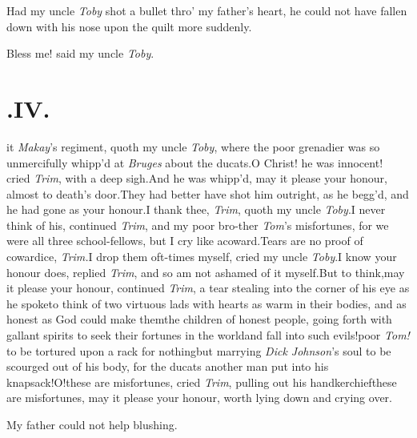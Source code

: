 \documentclass{article}
\begin{document}
\tsh Had my uncle \textit{Toby} shot a bullet thro’ my
father’s heart, he could not have fallen down with his nose
upon the quilt more suddenly.

Bless me! said my uncle \textit{Toby}.

\bigskip
\section{.\enspace IV.}

 it \textit{Makay}’s regiment, quoth\break
my uncle \textit{Toby}, where the poor\break
grenadier was so unmercifully whipp’d at \textit{Bruges}
about the ducats.\tsk O Christ! he was innocent! cried
\textit{Trim}, with a deep sigh.\tsk And he was whipp’d, may
it please your honour, almost to death’s door.\tsk They had
better have shot him outright, as he begg’d, and he had gone
as your honour.\tsh I thank thee, \textit{Trim}, quoth my uncle
\textit{Toby}.\tsh I never think of his, continued
\textit{Trim}, and my poor bro-\break ther \textit{Tom}’s
misfortunes, for we were all three school-fellows, but I cry
like a\break coward.\tsh Tears are no proof of cowardice,
\textit{Trim.}\tsk I drop them oft-times myself, cried my
uncle \textit{Toby}.\tsh I know your honour does, replied
\textit{Trim}, and so am not ashamed of it myself.\tsk But
to think,\break may it please your honour, continued
\textit{Trim}, a tear stealing into the corner of his eye as
he spoke\tsk to think of two virtuous lads with hearts as
warm in their bodies, and as honest as God could make
them\tsk the children of honest people, going forth with
gallant spirits to seek their fortunes in the world\tsk and
fall into such evils!\tsk poor \textit{Tom!} to be tortured
upon a rack for nothing\tsk but marrying\break
{}
\textit{Dick Johnson}’s soul to be scourged out of his body, for the ducats another man put
into his knapsack!\tsk O!\tsk these are misfortunes, cried
\textit{Trim}, pulling out his handkerchief\tsk these
are misfortunes, may it please your honour, worth lying down
and crying over.


\tsk My father could not help blushing.
\end{document}
